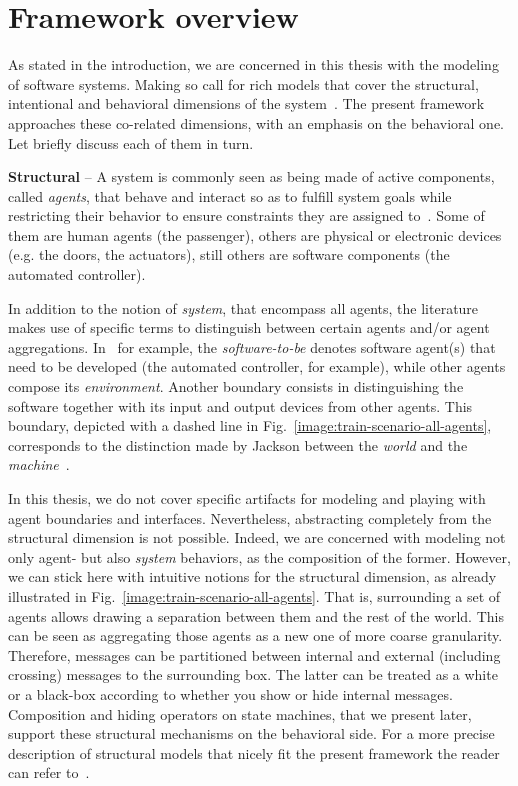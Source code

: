 \section{Framework overview\label{section:background-multi-agent-systems-and-behavior-modeling}}

As stated in the introduction, we are concerned in this thesis with the modeling of software systems. Making so call for rich models that cover the structural, intentional and behavioral dimensions of the system~\cite{VanLamsweerde:2000}. The present framework approaches these co-related dimensions, with an emphasis on the behavioral one. Let briefly discuss each of them in turn.

\noindent \textbf{Structural} -- A system is commonly seen as being made of active components, called \emph{agents}, that behave and interact so as to fulfill system goals while restricting their behavior to ensure constraints they are assigned to~\cite{Feather:1987}. Some of them are human agents (the passenger), others are physical or electronic devices (e.g. the doors, the actuators), still others are software components (the automated controller).

In addition to the notion of \emph{system}, that encompass all agents, the literature makes use of specific terms to distinguish between certain agents and/or agent aggregations. In~\cite{VanLamsweerde:2009} for example, the \emph{software-to-be} denotes software agent(s) that need to be developed (the automated controller, for example), while other agents compose its \emph{environment}. Another boundary consists in distinguishing the software together with its input and output devices from other agents. This boundary, depicted with a dashed line in Fig.~\ref{image:train-scenario-all-agents}, corresponds to the distinction made by Jackson between the \emph{world} and the \emph{machine}~\cite{Jackson:1995}.

In this thesis, we do not cover specific artifacts for modeling and playing with agent boundaries and interfaces. Nevertheless, abstracting completely from the structural dimension is not possible. Indeed, we are concerned with modeling not only agent- but also \emph{system} behaviors, as the composition of the former. However, we can stick here with intuitive notions for the structural dimension, as already illustrated in Fig.~\ref{image:train-scenario-all-agents}. That is, surrounding a set of agents allows drawing a separation between them and the rest of the world. This can be seen as aggregating those agents as a new one of more coarse granularity. Therefore, messages can be partitioned between internal and external (including crossing) messages to the surrounding box. The latter can be treated as a white or a black-box according to whether you show or hide internal messages. Composition and hiding operators on state machines, that we present later, support these structural mechanisms on the behavioral side. For a more precise description of structural models that nicely fit the present framework the reader can refer to~\cite{Magee:1995}.

